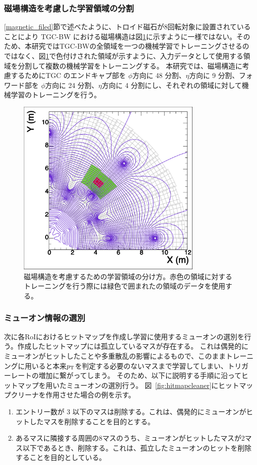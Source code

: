 \subsubsection{磁場構造を考慮した学習領域の分割}
\ref{magnetic_filed}節で述べたように、トロイド磁石が8回転対象に設置されていることにより TGC-BW における磁場構造は図\ref{fig:Mag}に示すように一様ではない。そのため、本研究ではTGC-BWの全領域を一つの機械学習でトレーニングさせるのではなく、図\ref{fig:Mag}で色付けされた領域が示すように、入力データとして使用する領域を分割して複数の機械学習をトレーニングする。
本研究では、磁場構造に考慮するためにTGC のエンドキャプ部を $\phi$方向に 48 分割、$\eta$方向に 9 分割、フォワード部を $\phi$方向に 24 分割、$\eta$方向に 4 分割にし、それぞれの領域に対して機械学習のトレーニングを行う。
\begin{figure}[tb]
  \centering
  \includegraphics[clip, width=9cm]{fig/4/c1_withMag.pdf}
  \caption{磁場構造を考慮するための学習領域の分け方。赤色の領域に対するトレーニングを行う際には緑色で囲まれたの領域のデータを使用する。}
  \label{fig:Mag}
\end{figure}

\subsubsection{ミューオン情報の選別}
次に各RoIにおけるヒットマップを作成し学習に使用するミューオンの選別を行う。作成したヒットマップには孤立しているマスが存在する。
これは偶発的にミューオンがヒットしたことや多重散乱の影響によるもので、このままトレーニングに用いると本来$p_{\rm{T}}$を判定する必要のないマスまで学習してしまい、トリガーレートの増加に繋がってしまう。
そのため、以下に説明する手順に沿ってヒットマップを用いたミューオンの選別行う。
図~\ref{fig:hitmapcleaner}にヒットマップクリーナを作用させた場合の例を示す。
\begin{enumerate}
   \item エントリー数が 3 以下のマスは削除する。これは、偶発的にミューオンがヒットしたマスを削除することを目的とする。
   \item あるマスに隣接する周囲の8マスのうち、ミューオンがヒットしたマスが2マス以下であるとき、削除する。これは、孤立したミューオンのヒットを削除することを目的としている。
\end{enumerate}


